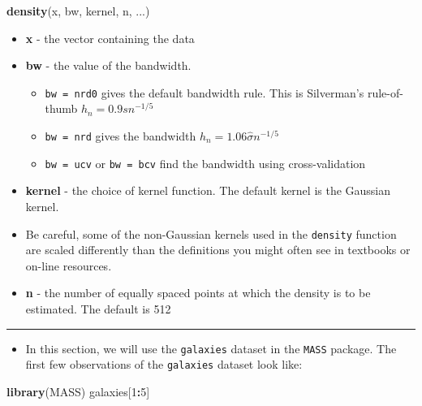 \documentclass[]{book}
\newenvironment{Shaded}{\begin{snugshade}}{\end{snugshade}}
\newcommand{\DecValTok}[1]{\textcolor[rgb]{0.00,0.00,0.81}{#1}}
\newcommand{\KeywordTok}[1]{\textcolor[rgb]{0.13,0.29,0.53}{\textbf{#1}}}
\newcommand{\NormalTok}[1]{#1}
\newcommand{\OperatorTok}[1]{\textcolor[rgb]{0.81,0.36,0.00}{\textbf{#1}}}
\providecommand{\tightlist}{%
  \setlength{\itemsep}{0pt}\setlength{\parskip}{0pt}}
\begin{document}
\begin{Shaded}
\begin{Highlighting}[]
\KeywordTok{density}\NormalTok{(x, bw, kernel, n, ...)}
\end{Highlighting}
\end{Shaded}

\begin{itemize}
\item
  \textbf{x} - the vector containing the data
\item
  \textbf{bw} - the value of the bandwidth.

  \begin{itemize}
  \tightlist
  \item
    \texttt{bw\ =\ nrd0} gives the default bandwidth rule. This is Silverman's rule-of-thumb \(h_{n} = 0.9 s n^{-1/5}\)
  \item
    \texttt{bw\ =\ nrd} gives the bandwidth \(h_{n} = 1.06 \hat{\sigma} n^{-1/5}\)
  \item
    \texttt{bw\ =\ ucv} or \texttt{bw\ =\ bcv} find the bandwidth using cross-validation
  \end{itemize}
\item
  \textbf{kernel} - the choice of kernel function. The default kernel is the Gaussian kernel.
\item
  Be careful, some of the non-Gaussian kernels used in the \texttt{density} function are scaled differently than the definitions you might often see in textbooks or on-line resources.
\item
  \textbf{n} - the number of equally spaced points at which the density is to be estimated. The default is 512
\end{itemize}

\begin{center}\rule{0.5\linewidth}{\linethickness}\end{center}

\begin{itemize}
\tightlist
\item
  In this section, we will use the \texttt{galaxies} dataset in the \texttt{MASS} package.
  The first few observations of the \texttt{galaxies} dataset look like:
\end{itemize}

\begin{Shaded}
\begin{Highlighting}[]
\KeywordTok{library}\NormalTok{(MASS)}
\NormalTok{galaxies[}\DecValTok{1}\OperatorTok{:}\DecValTok{5}\NormalTok{]}
\end{Highlighting}
\end{Shaded}
\end{document}

